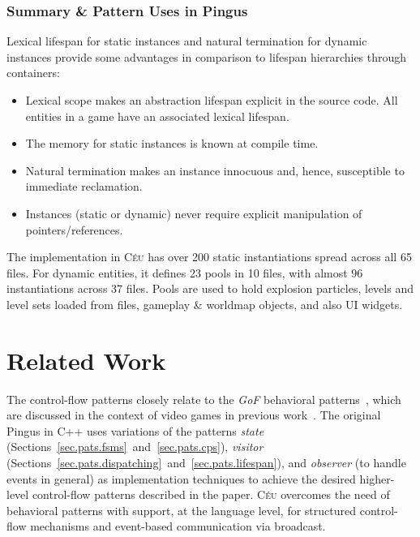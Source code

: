 \documentclass{vgtc}                          %
\newcommand{\CEU}{\textsc{C\'{e}u}\xspace}
\newcommand{\code}[1] {{\small{\texttt{#1}}}}
\begin{document}
\subsubsection{Summary \& Pattern Uses in Pingus}

Lexical lifespan for static instances and natural termination for dynamic
instances provide some advantages in comparison to lifespan hierarchies through
containers:

\begin{itemize}
\item Lexical scope makes an abstraction lifespan explicit in the source code.
      All entities in a game have an associated lexical lifespan.
\item The memory for static instances is known at compile time.
\item Natural termination makes an instance innocuous and, hence, susceptible
      to immediate reclamation.
\item Instances (static or dynamic) never require explicit manipulation of
      pointers/references.
\end{itemize}

The implementation in \CEU has over 200 static instantiations spread across all
65 files.
For dynamic entities, it defines 23 pools in 10 files, with almost 96
instantiations across 37 files.
Pools are used to hold explosion particles, levels and level sets loaded from
files, gameplay \& worldmap objects, and also UI widgets.

\section{Related Work}
\label{sec.related}

The control-flow patterns closely relate to the \emph{GoF} behavioral
patterns~\cite{gof}, which are discussed in the context of video games in
previous work~\cite{games.patterns,games.gof.2015,games.gof.2007}.
%
The original Pingus in C++ uses variations of the patterns
    \emph{state} (Sections~\ref{sec.pats.fsms}~and~\ref{sec.pats.cps}),
    \emph{visitor} (Sections~\ref{sec.pats.dispatching}~and~\ref{sec.pats.lifespan}), and
    \emph{observer} (to handle events in general)
as implementation techniques to achieve the desired higher-level
control-flow patterns described in the paper.
%
\CEU overcomes the need of behavioral patterns with support, at the language
level, for structured control-flow mechanisms and event-based communication via
broadcast.
%
\end{document}
